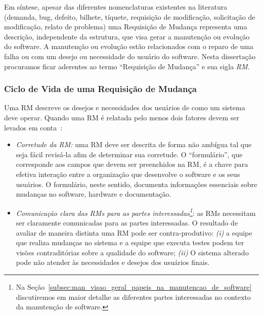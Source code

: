 Em síntese, apesar das diferentes nomenclaturas existentes na literatura
(demanda, bug, defeito, bilhete, tíquete, requisição de modificação, solicitação
de modificação, relato de problema) uma Requisição de Mudança representa uma
descrição, independente da estrutura, que visa gerar a manutenção ou evolução do
software. A manutenção ou evolução estão relacionados com o reparo de uma falha
ou com um desejo ou necessidade do usuário do software. Nesta dissertação
procuramos ficar aderentes ao termo ``Requisição de Mudança'' e sua sigla
\textit{RM}.

\subsubsection{Ciclo de Vida de uma Requisição de Mudança}
\label{sub:fluxo_de_trabalho_requisicao_mudanca}

Uma RM descreve os desejos e necessidades dos usuários de como um sistema deve
operar. Quando uma RM é relatada pelo menos dois fatores devem ser levados em
conta~\cite{tripathy2014software}:

\begin{itemize}
    \item \textit{Corretude da RM:} uma RM deve ser descrita de forma não
        ambígua tal que seja fácil revisá-la afim de determinar sua corretude. O
        ``formulário'', que corresponde aos campos que devem ser preenchidos na
        RM, é a chave para efetiva interação entre a organização que desenvolve
        o software e os seus usuários. O formulário, neste sentido, documenta
        informações essenciais sobre mudanças no software, hardware e
        documentação.
   \item \textit{Comunicação clara das RMs para as partes
           interessadas\footnote{Na
               Seção~\ref{subsec:man_visao_geral_papeis_na_manutencao_de_software}
               discutiremos em maior detalhe as diferentes partes interessadas
               no contexto da manutenção de software.}}: as RMs necessitam ser
       claramente comunicadas para as partes interessadas. O resultado de
       avaliar de maneira distinta uma RM pode ser contra-produtivo:
       \textit{(i)} a equipe que realiza mudanças no sistema e a equipe que
       executa testes podem ter visões contraditórias sobre a qualidade do
       software; \textit{(ii)} O sistema alterado pode não atender às
       necessidades e desejos dos usuários finais.
\end{itemize}

